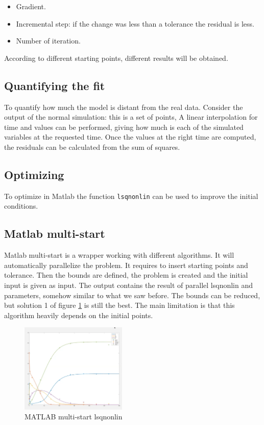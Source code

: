 \begin{multicols}{2}
  \begin{itemize}
    \item Gradient.
    \item Incremental step: if the change was less than a tolerance the residual is less.
    \item Number of iteration.
  \end{itemize}
\end{multicols}

According to different starting points, different results will be obtained.

  \subsection{Quantifying the fit}
  To quantify how much the model is distant from the real data.
  Consider the output of the normal simulation: this is a set of points,
  A linear interpolation for time and values can be performed, giving how much is each of the simulated variables at the requested time.
  Once the values at the right time are computed, the residuals can be calculated from the sum of squares.

  \subsection{Optimizing}
  To optimize in Matlab the function \texttt{lsqnonlin} can be used to improve the initial conditions.

  \subsection{Matlab multi-start}
  Matlab multi-start is a wrapper working with different algorithms.
  It will automatically parallelize the problem.
  It requires to insert starting points and tolerance.
  Then the bounds are defined, the problem is created and the initial input is given as input.
  The output contains the result of parallel lsqnonlin and parameters, somehow similar to what we saw before.
  The bounds can be reduced, but solution 1 of figure \ref{fig:lsqnonlin} is still the best.
  The main limitation is that this algorithm heavily depends on the initial points.

  \begin{figure}[H]
    \centering
    \includegraphics[width=0.45\textwidth]{multistep.png}
    \caption{MATLAB multi-start lsqnonlin}
    \label{fig:lsqnonlin}
  \end{figure}
